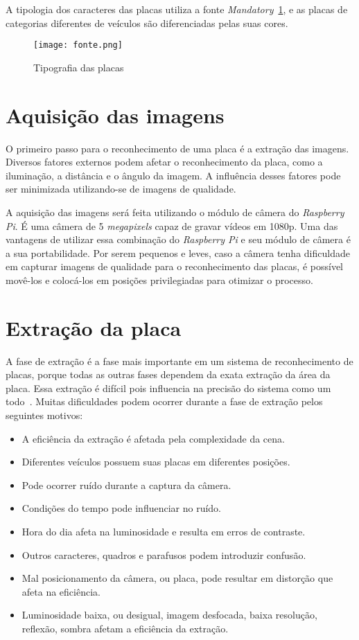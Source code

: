 A tipologia dos caracteres das placas utiliza a fonte
\emph{Mandatory}~\ref{fig:tipografia}, e as placas de categorias diferentes de veículos
são diferenciadas pelas suas cores.

\begin{figure}[H]
	\centering
	\texttt{[image: fonte.png]}
	\caption{Tipografia das placas}
	\label{fig:tipografia}
\end{figure}

\section{Aquisição das imagens}
\label{sec:aquisicao}

O primeiro passo para o reconhecimento de uma placa é a extração das imagens. Diversos fatores
externos podem afetar o reconhecimento da placa, como a iluminação, a distância
e o ângulo da imagem. A influência desses fatores pode ser minimizada
utilizando-se de imagens de qualidade.

A aquisição das imagens será feita utilizando o módulo de câmera do
\emph{Raspberry Pi}. É uma câmera de 5 \emph{megapixels} capaz de gravar vídeos
em 1080p. Uma das vantagens de utilizar essa combinação do \emph{Raspberry Pi} e
seu módulo de câmera é a sua portabilidade. Por serem pequenos e leves, caso a
câmera tenha dificuldade em capturar imagens de qualidade para o reconhecimento
das placas, é possível movê-los e colocá-los em posições privilegiadas para
otimizar o processo.

\section{Extração da placa}
\label{sec:extracao}

A fase de extração é a fase mais importante em um sistema de reconhecimento de
placas, porque todas as outras fases dependem da exata extração da área da
placa. Essa extração é difícil pois influencia na precisão do sistema como um
todo~\cite{kaur2014efficient}. Muitas dificuldades podem ocorrer durante a fase
de extração pelos seguintes motivos:

\begin{itemize}
	\item A eficiência da extração é afetada pela complexidade da cena.
	\item Diferentes veículos possuem suas placas em diferentes posições.
	\item Pode ocorrer ruído durante a captura da câmera.
	\item Condições do tempo pode influenciar no ruído.
	\item Hora do dia afeta na luminosidade e resulta em erros de contraste.
	\item Outros caracteres, quadros e parafusos podem introduzir confusão.
	\item Mal posicionamento da câmera, ou placa, pode resultar em distorção que afeta na eficiência.
	\item Luminosidade baixa, ou desigual, imagem desfocada, baixa resolução, reflexão, sombra afetam a eficiência da extração.
\end{itemize}


